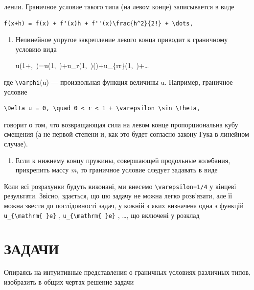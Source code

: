 \documentclass[
  ukrainian,
]{article}
\providecommand{\tightlist}{%
  \setlength{\itemsep}{0pt}\setlength{\parskip}{0pt}}
\begin{document}
лении. Граничное условие такого типа (на левом конце) записывается в
виде

\begin{verbatim}
f(x+h) = f(x) + f'(x)h + f''(x)\frac{h^2}{2!} + \dots,
\end{verbatim}

\begin{enumerate}
\def\labelenumi{\arabic{enumi}.}
\setcounter{enumi}{1}
\item
  Нелинейное упругое закрепление левого конца приводит к граничному
  условию вида

  u(1+\varepsilon\sin\theta,~\theta)=u(1,~\theta)+u\_r(1,~\theta)(\varepsilon\sin\theta)+u\_\{rr\}(1,~\theta)+\ldots
\end{enumerate}

где \texttt{\textbackslash{}varphi}(u) --- произвольная функция величины
u. Например, граничное условие

\begin{verbatim}
\Delta u = 0, \quad 0 < r < 1 + \varepsilon \sin \theta,
\end{verbatim}

говорит о том, что возвращающая сила на левом конце пропорциональна кубу
смещения (а не первой степени и, как это будет согласно закону Гука в
линейном случае).

\begin{enumerate}
\def\labelenumi{\arabic{enumi}.}
\setcounter{enumi}{2}
\tightlist
\item
  Если к нижнему концу пружины, совершающей продольные колебания,
  прикрепить массу \emph{m}, то граничное условие следует задавать в
  виде
\end{enumerate}

Коли всі розрахунки будуть виконані, ми внесемо
\texttt{\textbackslash{}varepsilon=1/4} у кінцеві результати. Звісно,
здається, що цю задачу не можна легко розв'язати, але її можна звести до
послідовності задач, у кожній з яких визначена одна з функцій
\texttt{u\_\{\textbackslash{}mathrm\{\ \}e\}} ,
\texttt{u\_\{\textbackslash{}mathrm\{\ \}e\}} , \ldots, що включені у
розклад

\section{ЗАДАЧИ}\label{ux437ux430ux434ux430ux447ux438-1}

Опираясь на интуитивные представления о граничных условиях различных
типов, изобразить в общих чертах решение задачи
\end{document}
